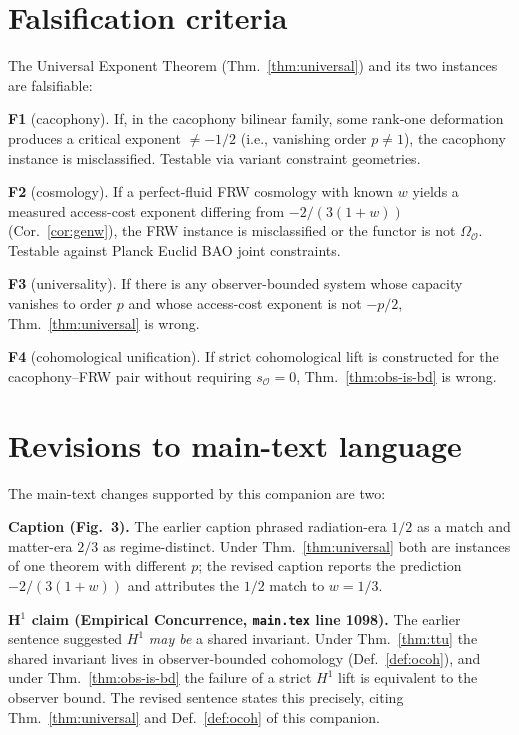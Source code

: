 \documentclass[11pt]{article}
\newcommand{\Obs}{\mathcal{O}}
\newcommand{\OmegaO}{\Omega_{\Obs}}
\newcommand{\rmin}{s_{\Obs}}
\begin{document}
\section{Falsification criteria}
\label{sec:falsifiability}

The Universal Exponent Theorem (Thm.~\ref{thm:universal}) and
its two instances are falsifiable:

\textbf{F1} (cacophony). If, in the cacophony
bilinear family, some rank-one deformation produces a critical
exponent $\neq -1/2$ (i.e., vanishing order $p \neq 1$), the
cacophony instance is misclassified. Testable via variant
constraint geometries.

\textbf{F2} (cosmology). If a perfect-fluid FRW cosmology with
known $w$ yields a measured access-cost exponent differing from
$-2/(3(1+w))$ (Cor.~\ref{cor:genw}), the FRW instance is
misclassified or the functor is not $\OmegaO$. Testable against
Planck Euclid BAO joint constraints.

\textbf{F3} (universality). If there is any observer-bounded
system whose capacity vanishes to order $p$ and whose
access-cost exponent is not $-p/2$, Thm.~\ref{thm:universal} is
wrong.

\textbf{F4} (cohomological unification). If strict cohomological
lift is constructed for the cacophony--FRW pair without
requiring $\rmin = 0$, Thm.~\ref{thm:obs-is-bd} is wrong.

\section{Revisions to main-text language}
\label{sec:revisions}

The main-text changes supported by this companion are two:

\textbf{Caption (Fig.~3).} The earlier caption phrased radiation-era
$1/2$ as a match and matter-era $2/3$ as regime-distinct. Under
Thm.~\ref{thm:universal} both are instances of one theorem with
different $p$; the revised caption reports the prediction
$-2/(3(1+w))$ and attributes the $1/2$ match to $w = 1/3$.

\textbf{H$^1$ claim (Empirical Concurrence, \texttt{main.tex} line 1098).}
The earlier sentence suggested $H^1$ \emph{may be} a shared
invariant. Under Thm.~\ref{thm:ttu} the shared invariant lives
in observer-bounded cohomology (Def.~\ref{def:ocoh}), and under
Thm.~\ref{thm:obs-is-bd} the failure of a strict $H^1$ lift is
equivalent to the observer bound. The revised sentence states
this precisely, citing Thm.~\ref{thm:universal} and
Def.~\ref{def:ocoh} of this companion.
\end{document}
